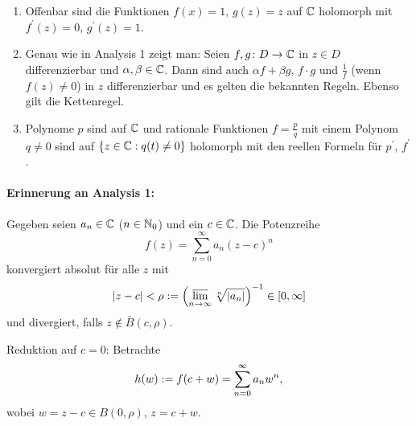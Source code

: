 \documentclass[a4paper,twoside,DIV15,BCOR12mm]{scrbook}
\begin{document}
\begin{bem} \label{bem1.2}
\begin{enumerate}
\item Offenbar sind die Funktionen $f(x)=1$, $g(z)=z$ auf $\mathbb{C}$ holomorph mit $f^\prime(z)=0$, $g^\prime(z)=1$.
\item Genau wie in Analysis 1 zeigt man: Seien $f, g\colon D \to \mathbb{C}$ in $z\in D$ differenzierbar und $\alpha, \beta \in
  \mathbb{C}$. Dann sind auch $\alpha f + \beta g$, $f\cdot g$ und $\frac1f$ (wenn $f(z)\neq0$) in $z$ differenzierbar und es gelten die
  bekannten Regeln. Ebenso gilt die Kettenregel.
\item Polynome $p$ sind auf $\mathbb{C}$ und rationale Funktionen $f = \frac{p}{q}$ mit einem Polynom $q \neq 0$ sind auf $\{z\in\mathbb{C}:
  q(t) \neq 0\}$ holomorph mit den reellen Formeln für $p^\prime$, $f^\prime$.
\end{enumerate}
\end{bem}

\paragraph{Erinnerung an Analysis 1:} Gegeben seien $a_n\in\mathbb{C}$ ($n\in\mathbb{N}_0$) und ein $c\in\mathbb{C}$. Die Potenzreihe
\[f(z) = \sum_{n=0}^\infty a_n(z-c)^n\]
konvergiert absolut für alle $z$ mit
\[|z-c| < \rho := \left(\varlimsup_{n\rightarrow\infty}\sqrt[n]{|a_n|}\right)^{-1}\in[0,\infty]\] 
und divergiert, falls $z\notin \bar{B}(c,\rho)$.

Reduktion auf $c=0$: Betrachte
\[h(w) := f(c+w) = \sum_{n=0}^\infty a_n w^n,\]
wobei $w=z-c\in B(0,\rho)$, $z=c+w$.
\end{document}
